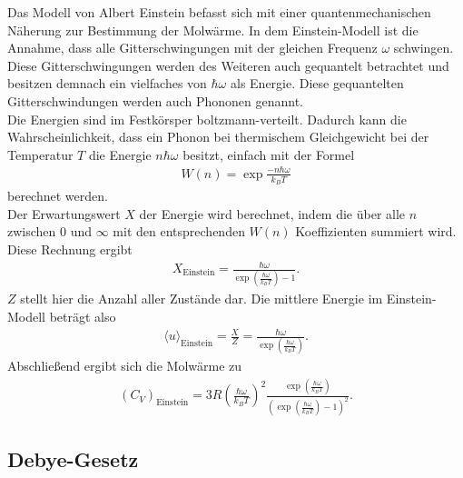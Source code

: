 Das Modell von Albert Einstein befasst sich mit einer quantenmechanischen Näherung zur Bestimmung der Molwärme. In dem Einstein-Modell ist die Annahme, 
dass alle Gitterschwingungen mit der gleichen Frequenz $\omega$ schwingen. Diese Gitterschwingungen werden des Weiteren auch gequantelt betrachtet und besitzen demnach ein 
vielfaches von $\hbar \omega$ als Energie. Diese gequantelten Gitterschwindungen werden auch Phononen genannt. \\

Die Energien sind im Festkörsper boltzmann-verteilt. Dadurch kann die Wahrscheinlichkeit, dass ein Phonon bei thermischem Gleichgewicht bei der Temperatur $T$ die Energie $n \hbar \omega$ besitzt, 
einfach mit der Formel
\begin{align*}
    W(n) = \exp{\frac{-n \hbar \omega}{k_B T}}
\end{align*}
berechnet werden. \\
Der Erwartungswert $X$ der Energie wird berechnet, indem die über alle $n$ zwischen $0$ und $\infty$ mit den entsprechenden $W(n)$ Koeffizienten summiert wird. 
Diese Rechnung ergibt
\begin{align*}
    X_{\text{Einstein}} = \frac{\hbar \omega}{\exp \left( \frac{\hbar \omega}{k_B T}\right) -1} .
\end{align*} 
$Z$ stellt hier die Anzahl aller Zustände dar. Die mittlere Energie im Einstein-Modell beträgt also 
\begin{align*}
    \langle u \rangle_{\text{Einstein}} = \frac{X}{Z} = \frac{\hbar \omega }{\exp \left( \frac{\hbar \omega}{k_B T}\right)}.
\end{align*}
Abschließend ergibt sich die Molwärme zu 
\begin{align}
    \label{eqn:moleinstein}
    (C_V)_{\text{Einstein}} = 3 R \left( \frac{\hbar \omega}{k_B T}\right)^2 \frac{\exp \left(\frac{\hbar \omega}{k_B T}\right)}{\left(\exp \left(\frac{\hbar \omega}{k_B T}\right) -1 \right)^2}.
\end{align}

\subsection{Debye-Gesetz}
\label{sec:debye}

